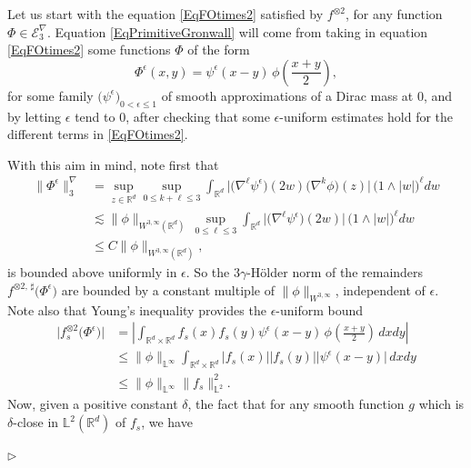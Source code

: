 \documentclass[11pt,a4paper]{amsart}
\newcommand{\RR}{\mathbb{R}}  \newcommand{\CC}{\mathbb{C}}  \newcommand{\LL}{\mathbb{L}}  \newcommand{\WW}{\mathbb{W}}
\newcommand{\mcE}{\mathcal{E}}
\renewcommand{\leq}{\leqslant}
\newcommand{\ssk}{\smallskip}
\numberwithin{equation}{section} %
\newenvironment{Dem}{%
    \begin{list}{\hspace{0.5cm}{\sc Proof --}}{%
        \setlength{\topsep}{0pt}%
        \setlength{\leftmargin}{0pt}%
        \setlength{\rightmargin}{0pt}%
        \setlength{\listparindent}{0pt}%
        \setlength{\itemindent}{0pt}%
        \setlength{\parsep}{0pt}%
        \addtolength{\leftmargin}{20pt}%
        \addtolength{\rightmargin}{0pt}%
    } \item }{\hfill{\space $\rhd$}\end{list}\smallskip}
\begin{document}
\begin{Dem}
Let us start with the equation \eqref{EqFOtimes2} satisfied by $f^{\otimes 2}$, for any function $\Phi\in \mcE^\nabla_3$. Equation \eqref{EqPrimitiveGronwall} will come from taking in equation \eqref{EqFOtimes2} some functions $\Phi$ of the form
$$
\Phi^\epsilon(x,y) = \psi^\epsilon(x-y)\,\phi\left(\frac{x+y}{2}\right),
$$
for some family $\big(\psi^\epsilon\big)_{0<\epsilon\leq 1}$ of smooth approximations of a Dirac mass at $0$, and by letting $\epsilon$ tend to $0$, after checking that some $\epsilon$-uniform estimates hold for the different terms in \eqref{EqFOtimes2}.

\ssk
 
With this aim in mind, note first that 
\begin{equation}
\label{EqBoundNabla3}
\begin{split}
\big\| \Phi^\epsilon \big\|^\nabla_3 &= \sup_{z\in \RR^d} \sup_{0 \leqslant k + \ell \leqslant 3}\int_{\RR^d}  \big| \big(\nabla^\ell \psi^{\epsilon}\big)(2w) \big(\nabla^k\phi\big) (z) \big|\,\big(1\wedge |w|\big)^\ell dw \\
&\lesssim \| \phi \|_{W^{3,\infty}(\RR^d)}  \, \sup_{0 \leqslant \ell \leqslant 3} \int_{\RR^d}  \big|(\nabla^\ell \psi^{\epsilon}\big)(2w) \big| \,(1\wedge | w |\big) ^\ell dw  \\
&\leqslant C \| \phi \|_{W^{3,\infty}(\RR^d)},
\end{split}
\end{equation}
is bounded above uniformly in $\epsilon$. So the $3\gamma$-H\"older norm of the remainders $f^{\otimes 2,\,\sharp}\big(\Phi^\epsilon\big)$ are bounded by a constant multiple of $\| \phi \|_{W^{3,\infty}}$, independent of $\epsilon$. Note also that Young's inequality provides the $\epsilon$-uniform bound
\begin{equation*}
\begin{split}
\Big|f^{\otimes 2}_s \big(\Phi^\epsilon\big)\Big| &= \left|\int_{\RR^d \times \RR^d} f_s(x) f_s(y) \psi^\epsilon(x-y)\,\phi\left(\frac{x+y}{2}\right)\,dxdy \right|  \\
&\leq \|\phi\|_{\LL^\infty} \int_{\RR^d \times \RR^d}  \big| f_s(x)\big| \big| f_s(y)\big| \big|\psi^{\epsilon} (x - y)\big|\,dx dy \\
&\leq  \|\phi\|_{\LL^\infty} \big\|f_s\big\|_{\LL^2}^2. 
\end{split}
\end{equation*} 
Now, given a positive constant $\delta$, the fact that for any smooth function $g$ which is $\delta$-close in $\LL^2(\RR^d)$ of $f_s$, we have

\end{Dem}
\end{document}
